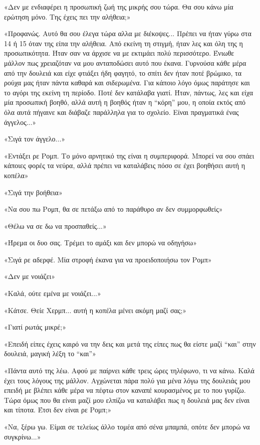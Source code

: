 \documentclass[12pt,twoside, openany]{book}
\begin{document}
«Δεν με ενδιαφέρει η προσωπική ζωή της μικρής σου τώρα. Θα σου κάνω μία ερώτηση μόνο. Της έχεις πει την αλήθεια;»

«Προφανώς. Αυτό θα σου έλεγα τώρα αλλα με διέκοψες... Πρέπει να ήταν γύρω στα 14 ή 15 όταν της είπα την αλήθεια. Από εκείνη τη στιγμή, ήταν λες και όλη της η προσωπικότητα. Ήταν σαν να άρχισε να με εκτιμάει πολύ περισσότερο. Ένιωθε μάλλον πως χρειαζόταν να μου ανταποδώσει αυτό που έκανα. Γυρνούσα κάθε μέρα από την δουλειά και είχε φτιάξει ήδη φαγητό, το σπίτι δεν ήταν ποτέ βρώμικο, τα ρούχα μας ήταν πάντα καθαρά και σιδερωμένα. Για κάποιο λόγο όμως παράτησε και το αγόρι της εκείνη τη περίοδο. Ποτέ δεν κατάλαβα γιατί. Ήταν, πάντως, λες και είχα μία προσωπική βοηθό, αλλά αυτή η βοηθός ήταν η “κόρη” μου, η οποία εκτός από όλα αυτά πήγαινε και διάβαζε παράλληλα για το σχολείο. Είναι πραγματικά ένας άγγελος...»

«Σιγά τον άγγελο...»

«Εντάξει ρε Ρομπ. Το μόνο αρνητικό της είναι η συμπεριφορά. Μπορεί να σου σπάει κάποιες φορές τα νεύρα, αλλά πρέπει να καταλάβεις πόσο σε έχει βοηθήσει αυτή η κοπέλα»

«Σιγά την βοήθεια»

«Να σου πω Ρομπ, θα σε πετάξω από το παράθυρο αν δεν συμμορφωθείς»

«Θέλω να σε δω να προσπαθείς...»

«Ήρεμα οι δυο σας. Τρέμει το αμάξι και δεν μπορώ να οδηγήσω»

«Σιγά ρε αδερφέ. Μία στροφή έκανα για να προειδοποιήσω τον Ρομπ»

«Δεν με νοιάζει»

«Καλά, ούτε εμένα με νοιάζει...»

«Κάτσε. Θείε Χερμπ... αυτή η κοπέλα μένει ακόμη μαζί σας;»

«Γιατί ρωτάς μικρέ;»

«Επειδή είπες έχεις καιρό να την δεις και μετά της είπες πως θα είστε μαζί “και” στην δουλειά, μαγική λέξη το “και”»

«Πάντα αυτό της λέω. Αφού με παίρνει κάθε τρεις ώρες τηλέφωνο, τι να κάνω. Καλά έχει τους λόγους της μάλλον. Αγχώνεται πάρα πολύ για μένα λόγω της δουλειάς μου επειδή με βλέπει κάθε μέρα να πέφτω στον καναπέ κουρασμένος με το που γυρίζω. Τώρα όμως που θα είναι μαζί μου ελπίζω να καταλάβει πως η δουλειά μας δεν είναι και τίποτα. Έτσι δεν είναι ρε Ρομπ;»

«Να, ξέρω γω. Είμαι σε τελείως άλλο τομέα από σένα μπαμπά, οπότε δεν μπορώ να συγκρίνω...»
\end{document}

